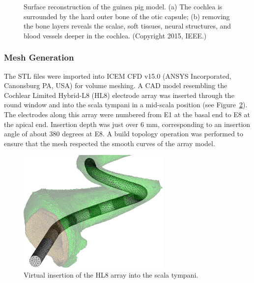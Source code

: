\begin{figure}
	\caption[Surface reconstruction of the guinea pig model]{Surface reconstruction
	of the guinea pig model. (a) The cochlea is surrounded by the hard outer bone
	of the otic capsule; (b) removing the bone layers reveals the scalae, soft
	tissues, neural structures, and blood vessels deeper in the cochlea. (Copyright
	\textcopyright{} 2015, IEEE.)}
	\label{fig:gp_model}
\end{figure}

\subsubsection{Mesh Generation}
\label{sect:gp_mesh_gen}

The STL files were imported into ICEM CFD v15.0 (ANSYS Incorporated, Canonsburg
PA, USA) for volume meshing. A CAD model resembling the Cochlear Limited
Hybrid-L8 (HL8) electrode array was inserted through the round window and into
the scala tympani in a mid-scala position (see Figure~\ref{fig:hl8_insertion}).
The electrodes along this array were numbered from E1 at the basal end to E8 at
the apical end. Insertion depth was just over 6 mm, corresponding to an
insertion angle of about 380 degrees at E8. A build topology operation was
performed to ensure that the mesh respected the smooth curves of the array
model.

\begin{figure}
	\centering
	\includegraphics[width=7.5cm]{Methodology/hl8_insertion}
	\caption[Virtual insertion of the HL8 array into the scala tympani]{Virtual
	insertion of the HL8 array into the scala tympani.}
	\label{fig:hl8_insertion}
\end{figure}

